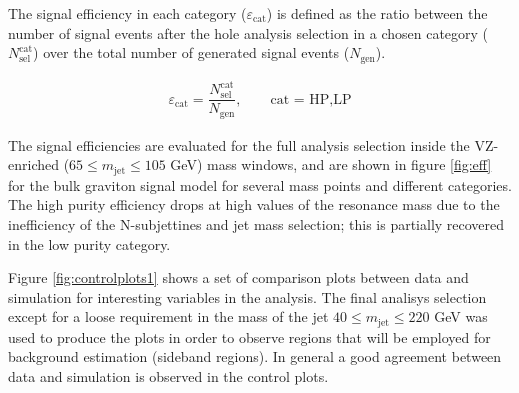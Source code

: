 The signal efficiency in each category ($\varepsilon_{\text{cat}}$) is defined as the ratio between the number of signal events after the hole analysis selection in a chosen category ($N^{\text{cat}}_{\text{sel}}$) over the total number of generated signal events ($N_{\text{gen}}$).

\begin{eqnarray}
\varepsilon_{\text{cat}} = \dfrac{N^{\text{cat}}_{\text{sel}} }{N_{\text{gen}}},\qquad  \text{cat = HP,LP} 
\end{eqnarray}

The signal efficiencies are evaluated for the full analysis selection inside the VZ-enriched ($65 \leq  m_{\text{jet}} \leq 105$ GeV) mass windows, and are shown in figure \ref{fig:eff} for the bulk graviton signal model for several mass points and different categories. The high purity efficiency drops at high values of the resonance mass due to the inefficiency of the N-subjettines and jet mass selection; this is partially recovered in the low purity category.

Figure \ref{fig:controlplots1} shows a set of comparison plots between data and simulation for interesting variables in the analysis. The final analisys selection except for a loose requirement in the mass of the jet $40 \leq  m_{\text{jet}} \leq 220$ GeV was used to produce the plots in order to observe regions that will be employed for background estimation (sideband regions). In general a good agreement between data and simulation is observed in the control plots.

